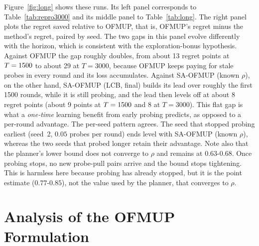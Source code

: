 \documentclass[letterpaper]{article}
\begin{document}
Figure~\ref{fig:long} shows these runs. Its left panel corresponds to
Table~\ref{tab:repro3000} and its middle panel to Table~\ref{tab:long}. The right
panel plots the regret saved relative to OFMUP, that is, OFMUP's regret minus
the method's regret, paired by seed. The two gaps in this panel evolve
differently with the horizon, which is consistent with the exploration-bonus
hypothesis. Against OFMUP the gap roughly doubles, from about 13 regret points
at $T=1500$ to about 29 at $T=3000$, because OFMUP keeps paying for stale probes in
every round and its loss accumulates. Against SA-OFMUP (known $\rho$), on the
other hand, SA-OFMUP (LCB, final) builds its lead over roughly the first 1500
rounds, while it is still probing, and the lead then levels off at about 8
regret points (about 9 points at $T=1500$ and 8 at $T=3000$). This flat gap is what
a \emph{one-time} learning benefit from early probing predicts, as opposed to a
per-round advantage. The per-seed pattern agrees. The seed that stopped probing
earliest (seed~2, $0.05$ probes per round) ends level with SA-OFMUP (known
$\rho$), whereas the two seeds that probed longer retain their advantage. Note
also that the planner's lower bound does not converge to $\rho$ and remains at
$0.63$-$0.68$. Once probing stops, no new probe-pull pairs arrive and the bound
stops tightening. This is harmless here because probing has already stopped,
but it is the point estimate ($0.77$-$0.85$), not the value used by the planner,
that converges to $\rho$.

\section{Analysis of the OFMUP Formulation}
\label{sec:findings}
\end{document}
